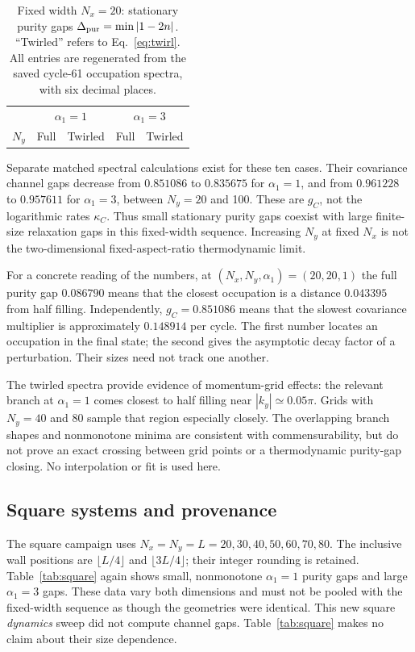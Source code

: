 \documentclass[aps,prb,onecolumn,nofootinbib,superscriptaddress,floatfix]{revtex4-2}
\begin{document}
\begin{table}[tbp]
\caption{Fixed width $N_x=20$: stationary purity gaps
$\Delta_{\rm pur}=\min|1-2n|$. ``Twirled'' refers to
Eq.~\eqref{eq:twirl}. All entries are regenerated from the saved
cycle-61 occupation spectra, with six decimal places.}
\label{tab:fixed}
\begin{ruledtabular}
\begin{tabular}{rcccc}
 &\multicolumn{2}{c}{$\alpha_1=1$}
 &\multicolumn{2}{c}{$\alpha_1=3$}\\
 $N_y$ & Full & Twirled & Full & Twirled\\
 
\end{tabular}
\end{ruledtabular}
\end{table}

Separate matched spectral calculations exist for these ten cases.
Their covariance channel gaps decrease from $0.851086$ to
$0.835675$ for $\alpha_1=1$, and from $0.961228$ to $0.957611$
for $\alpha_1=3$, between $N_y=20$ and 100. These are $g_C$,
not the logarithmic rates $\kappa_C$. Thus small stationary purity
gaps coexist with large finite-size relaxation gaps in this
fixed-width sequence. Increasing $N_y$ at fixed $N_x$ is not the
two-dimensional fixed-aspect-ratio thermodynamic limit.

For a concrete reading of the numbers, at
$(N_x,N_y,\alpha_1)=(20,20,1)$ the full purity gap $0.086790$
means that the closest occupation is a distance $0.043395$
from half filling. Independently, $g_C=0.851086$ means that the
slowest covariance multiplier is approximately $0.148914$
per cycle. The first number locates an occupation in the final
state; the second gives the asymptotic decay factor of a perturbation.
Their sizes need not track one another.

The twirled spectra provide evidence of momentum-grid effects:
the relevant branch at $\alpha_1=1$ comes closest to half filling
near $|k_y|\simeq0.05\pi$. Grids with $N_y=40$ and 80 sample that
region especially closely. The overlapping branch shapes and
nonmonotone minima are consistent with commensurability, but do
not prove an exact crossing between grid points or a thermodynamic
purity-gap closing. No interpolation or fit is used here.

\subsection{Square systems and provenance}
The square campaign uses $N_x=N_y=L=20,30,40,50,60,70,80$.
The inclusive wall positions are $\lfloor L/4\rfloor$ and
$\lfloor3L/4\rfloor$; their integer rounding is retained.
Table~\ref{tab:square} again shows small, nonmonotone
$\alpha_1=1$ purity gaps and large $\alpha_1=3$ gaps. These
data vary both dimensions and must not be pooled with the
fixed-width sequence as though the geometries were identical.
This new square \emph{dynamics} sweep did not compute channel
gaps. Table~\ref{tab:square} makes no claim about their size dependence.
\end{document}
